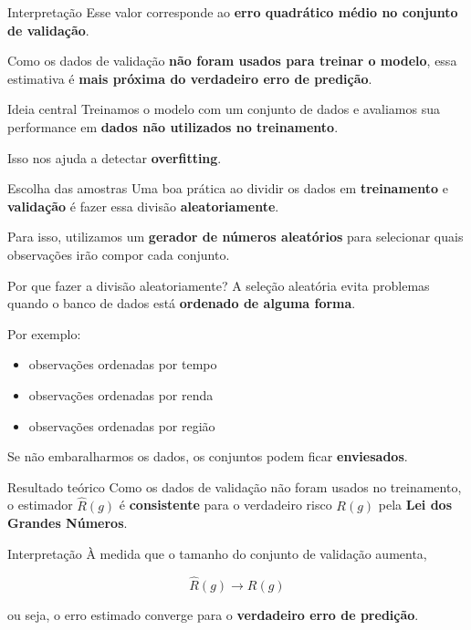 \documentclass[
  ignorenonframetext,
  aspectratio=169,
]{beamer}
\providecommand{\tightlist}{%
  \setlength{\itemsep}{0pt}\setlength{\parskip}{0pt}}
\begin{document}
\begin{frame}
\begin{block}{Interpretação}
\label{interpretauxe7uxe3o-2}
Esse valor corresponde ao \textbf{erro quadrático médio no conjunto de
validação}.

Como os dados de validação \textbf{não foram usados para treinar o
modelo}, essa estimativa é \textbf{mais próxima do verdadeiro erro de
predição}.
\end{block}

\begin{block}{Ideia central}
\label{ideia-central}
Treinamos o modelo com um conjunto de dados e avaliamos sua performance
em \textbf{dados não utilizados no treinamento}.

Isso nos ajuda a detectar \textbf{overfitting}.
\end{block}
\end{frame}

\begin{frame}{Escolha das amostras}
\label{escolha-das-amostras}
Uma boa prática ao dividir os dados em \textbf{treinamento} e
\textbf{validação} é fazer essa divisão \textbf{aleatoriamente}.

Para isso, utilizamos um \textbf{gerador de números aleatórios} para
selecionar quais observações irão compor cada conjunto.
\end{frame}

\begin{frame}
\begin{block}{Por que fazer a divisão aleatoriamente?}
\label{por-que-fazer-a-divisuxe3o-aleatoriamente}
A seleção aleatória evita problemas quando o banco de dados está
\textbf{ordenado de alguma forma}.

Por exemplo:

\begin{itemize}
\tightlist
\item
  observações ordenadas por tempo
\item
  observações ordenadas por renda
\item
  observações ordenadas por região
\end{itemize}

Se não embaralharmos os dados, os conjuntos podem ficar
\textbf{enviesados}.
\end{block}
\end{frame}

\begin{frame}{Resultado teórico}
\label{resultado-teuxf3rico}
Como os dados de validação não foram usados no treinamento, o estimador
\(\hat{R}(g)\) é \textbf{consistente} para o verdadeiro risco \(R(g)\)
pela \textbf{Lei dos Grandes Números}.

\begin{block}{Interpretação}
\label{interpretauxe7uxe3o-3}
À medida que o tamanho do conjunto de validação aumenta,

\[
\hat{R}(g) \rightarrow R(g)
\]

ou seja, o erro estimado converge para o \textbf{verdadeiro erro de
predição}.
\end{block}
\end{frame}
\end{document}

